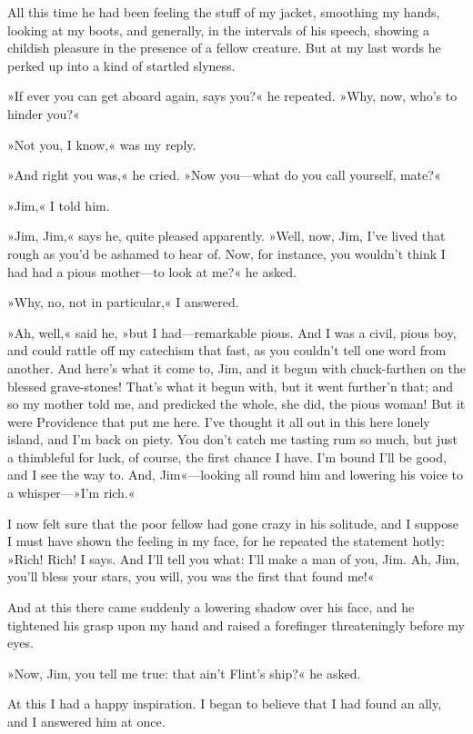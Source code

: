 All this time he had been feeling the stuff of my jacket, smoothing my hands, looking at my boots, and generally, in the intervals of his speech, showing a childish pleasure in the presence of a fellow creature. But at my last words he perked up into a kind of startled slyness.

»If ever you can get aboard again, says you?« he repeated. »Why, now, who's to hinder you?«

»Not you, I know,« was my reply.

»And right you was,« he cried. »Now you—what do you call yourself, mate?«

»Jim,« I told him.

»Jim, Jim,« says he, quite pleased apparently. »Well, now, Jim, I've lived that rough as you'd be ashamed to hear of. Now, for instance, you wouldn't think I had had a pious mother—to look at me?« he asked.

»Why, no, not in particular,« I answered.

»Ah, well,« said he, »but I had—remarkable pious. And I was a civil, pious boy, and could rattle off my catechism that fast, as you couldn't tell one word from another. And here's what it come to, Jim, and it begun with chuck-farthen on the blessed grave-stones! That's what it begun with, but it went further'n that; and so my mother told me, and predicked the whole, she did, the pious woman! But it were Providence that put me here. I've thought it all out in this here lonely island, and I'm back on piety. You don't catch me tasting rum so much, but just a thimbleful for luck, of course, the first chance I have. I'm bound I'll be good, and I see the way to. And, Jim«—looking all round him and lowering his voice to a whisper—»I'm rich.«

I now felt sure that the poor fellow had gone crazy in his solitude, and I suppose I must have shown the feeling in my face, for he repeated the statement hotly: »Rich! Rich! I says. And I'll tell you what: I'll make a man of you, Jim. Ah, Jim, you'll bless your stars, you will, you was the first that found me!«

And at this there came suddenly a lowering shadow over his face, and he tightened his grasp upon my hand and raised a forefinger threateningly before my eyes.

»Now, Jim, you tell me true: that ain't Flint's ship?« he asked.

At this I had a happy inspiration. I began to believe that I had found an ally, and I answered him at once.

